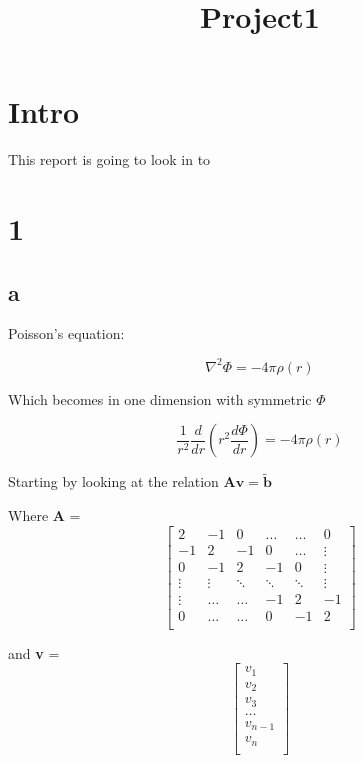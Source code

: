 \documentclass[12pt]{article}
\begin{document}
\title{Project1}


\section*{Intro}

This report is going to look in to 


\section*{1}

\subsection*{a}
Poisson's equation: 

\begin{equation}
 \nabla^2 \Phi = -4\pi \rho(r)
\end{equation}


Which becomes in one dimension with symmetric $\Phi$ 

\begin{equation}
\frac{1}{r^2} \frac{d}{dr}(r^2\frac{d\Phi}{dr}) = -4\pi \rho(r)
\end{equation}


Starting by looking at the relation 
$\textbf{Av} = \tilde{\textbf{b}}$

Where \textbf{A} =
$$
\begin{bmatrix}
2 & -1 & 0 & \ldots & \ldots & 0 \\
-1 & 2 & -1 & 0 &\ldots & \vdots \\ 
0 & -1 & 2 & -1 & 0 & \vdots \\
\vdots & \vdots & \ddots & \ddots & \ddots & \vdots\\ 
\vdots & \ldots & \ldots & -1 & 2 & -1\\
0 & \ldots & \ldots & 0 & -1 & 2\\
\end{bmatrix}
$$

and \textbf{v} = $$\begin{bmatrix}
v_1\\
v_2\\
v_3\\
\ldots\\
v_{n-1}\\
v_{n}\\
\end{bmatrix}
$$
\end{document}
